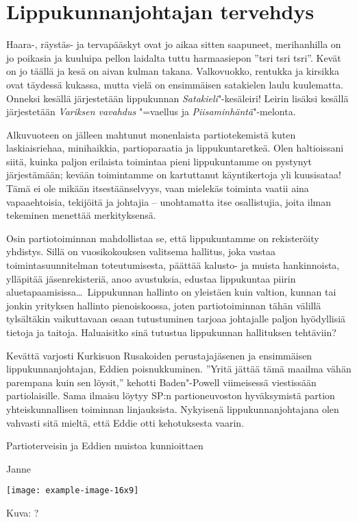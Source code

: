 \section{Lippukunnanjohtajan tervehdys}

\begin{multicols}{2}
\noindent Haara-, räystäs- ja tervapääskyt ovat jo aikaa sitten saapuneet, merihanhilla on jo poikasia ja kuuluipa pellon laidalta tuttu harmaasiepon ''tsri tsri tsri''. Kevät on jo täällä ja kesä on aivan kulman takana. Valkovuokko, rentukka ja kirsikka ovat täydessä kukassa, mutta vielä on ensimmäisen satakielen laulu kuulematta. Onneksi kesällä järjestetään lippukunnan \textit{Satakieli}"-kesäleiri! Leirin lisäksi kesällä järjestetään \textit{Variksen vavahdus} "=vaellus ja \textit{Piisaminhäntä}"-melonta.

Alkuvuoteen on jälleen mahtunut monenlaista partiotekemistä kuten laskiaisriehaa, minihaikkia, partioparaatia ja lippukuntaretkeä. Olen haltioissani siitä, kuinka paljon erilaista toimintaa pieni lippukuntamme on pystynyt järjestämään; kevään toimintamme on kartuttanut käyntikertoja yli kuusisataa! Tämä ei ole mikään itsestäänselvyys, vaan mielekäs toiminta vaatii aina vapaaehtoisia, tekijöitä ja johtajia -- unohtamatta itse osallistujia, joita ilman tekeminen menettää merkityksensä.  

Osin partiotoiminnan mahdollistaa se, että lippukuntamme on rekisteröity yhdistys. Sillä on vuosikokouksen valitsema hallitus, joka vastaa toimintasuunnitelman toteutumisesta, päättää kalusto- ja muista hankinnoista, ylläpitää jäsenrekisteriä, anoo avustuksia, edustaa lippukuntaa piirin aluetapaamisissa\ldots\ Lippukunnan hallinto on yleistäen kuin valtion, kunnan tai jonkin yrityksen hallinto pienoiskoossa, joten partiotoiminnan tähän välillä tylsältäkin vaikuttavaan osaan tutustuminen tarjoaa johtajalle paljon hyödyllisiä tietoja ja taitoja. Haluaisitko sinä tutustua lippukunnan hallituksen tehtäviin? 

Kevättä varjosti Kurkisuon Rusakoiden perustajajäsenen ja ensimmäisen lippukunnanjohtajan, Eddien poisnukkuminen. ''Yritä jättää tämä maailma vähän parempana kuin sen löysit,'' kehotti Baden"-Powell viimeisessä viestissään partiolaisille. Sama ilmaisu löytyy SP:n partioneuvoston hyväksymistä partion yhteiskunnallisen toiminnan linjauksista. Nykyisenä lippukunnanjohtajana olen vahvasti sitä mieltä, että Eddie otti kehotuksesta vaarin.

Partioterveisin ja Eddien muistoa kunnioittaen

\noindent\null\hfill Janne

\smallskip

\noindent\texttt{[image: example-image-16x9]}

\smallskip

\noindent\null\hfill Kuva: ?
\end{multicols}
